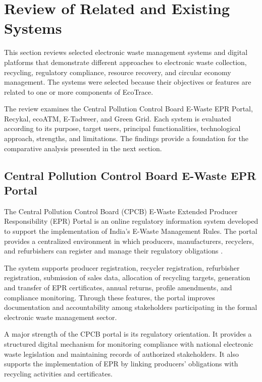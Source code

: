 \section{Review of Related and Existing Systems}

This section reviews selected electronic waste management systems and digital
platforms that demonstrate different approaches to electronic waste collection,
recycling, regulatory compliance, resource recovery, and circular economy
management. The systems were selected because their objectives or features are
related to one or more components of EcoTrace.

The review examines the Central Pollution Control Board E-Waste EPR Portal,
Recykal, ecoATM, E-Tadweer, and Green Grid. Each system is evaluated according
to its purpose, target users, principal functionalities, technological approach,
strengths, and limitations. The findings provide a foundation for the comparative
analysis presented in the next section.

\subsection{Central Pollution Control Board E-Waste EPR Portal}

The Central Pollution Control Board (CPCB) E-Waste Extended Producer
Responsibility (EPR) Portal is an online regulatory information system developed
to support the implementation of India's E-Waste Management Rules. The portal
provides a centralized environment in which producers, manufacturers, recyclers,
and refurbishers can register and manage their regulatory obligations
\citep{cpcb2026}.

The system supports producer registration, recycler registration, refurbisher
registration, submission of sales data, allocation of recycling targets, generation
and transfer of EPR certificates, annual returns, profile amendments, and
compliance monitoring. Through these features, the portal improves
documentation and accountability among stakeholders participating in the formal
electronic waste management sector.

A major strength of the CPCB portal is its regulatory orientation. It provides a
structured digital mechanism for monitoring compliance with national electronic
waste legislation and maintaining records of authorized stakeholders. It also
supports the implementation of EPR by linking producers' obligations with
recycling activities and certificates.

